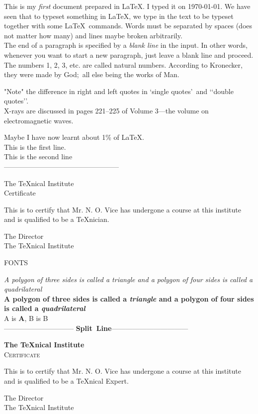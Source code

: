 \documentclass{article}
\begin{document}
This is my \emph{first} document prepared in \LaTeX. I typed it on \today.
\indent We have seen that to typeset something in \LaTeX, we type in the
text to be typeset together with some \LaTeX\ commands.
Words must be separated by spaces (does not matter how many)
and lines maybe broken arbitrarily.\\
\indent The end of a paragraph is specified by a \emph{blank line}
in the input. In other words, whenever you want to start a new
paragraph, just leave a blank line and proceed.\\
\indent The numbers 1, 2, 3, etc. are called natural numbers. According to
Kronecker, they were made by God;\ all else being the works of Man.

"Note" the difference in right and left quotes in \lq single
quotes\rq\ and \lq\lq double quotes\rq\rq.\\
\indent X-rays are discussed in pages 221--225 of Volume 3---the volume on
electromagnetic waves.

Maybe I have now learnt about 1\% of \LaTeX.\\
This is the first line.\\[10pt] 
This is the second line\\
--------------------------------------------------\\
\begin{center}
	The \TeX nical Institute\\[.75cm]
	Certificate
\end{center}
\noindent This is to certify that Mr. N. O. Vice has undergone a
course at this institute and is qualified to be a \TeX nician.
\begin{flushright}
	The Director\\
	The \TeX nical Institute
\end{flushright} 
\begin{center}
	FONTS
\end{center}
\noindent \textit{A polygon of three sides is called a \emph{triangle} and a
polygon of four sides is called a \emph{quadrilateral}}\\
\textbf{A polygon of three sides is called a
	\emph{triangle} and a polygon of four sides is called a
	\emph{quadrilateral}}\\
    A is \textbf{A}, B is B\\
------------------------------ \textbf{Split\ Line}---------------------------------
\begin{center}
	{\bfseries\huge The \TeX nical Institute}\\[1cm]
	{\scshape\LARGE Certificate}
\end{center}
\noindent This is to certify that Mr. N. O. Vice has undergone a
course at this institute and is qualified to be a \TeX nical Expert.
\begin{flushright}
	{\sffamily The Director\\
		The \TeX nical Institute}
\end{flushright}
\end{document}
